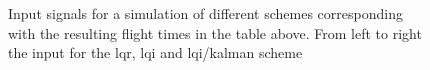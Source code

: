 \documentclass[]{article}
\begin{document}
\begin{figure}[H]
\begin{minipage}{.3\textwidth}
\end{minipage}
\caption{Input signals for a simulation of different schemes corresponding with the resulting flight times in the table above. From left to right the input for the lqr, lqi and lqi/kalman scheme}
\end{figure}
\end{document}
